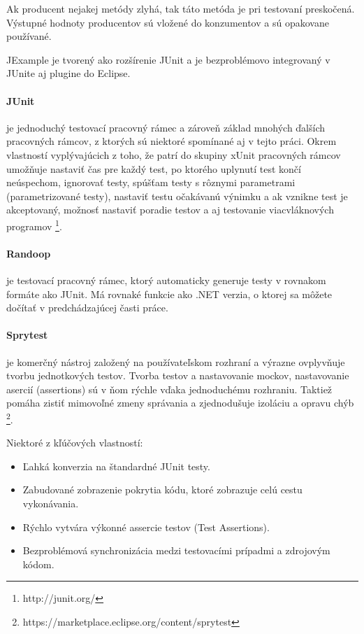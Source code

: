 \documentclass[11pt,twoside,slovak,a4paper]{article}
\begin{document}
	Ak producent nejakej metódy zlyhá, tak táto metóda je pri testovaní preskočená. Výstupné hodnoty producentov sú vložené do konzumentov a sú opakovane používané.
	
	JExample je tvorený ako rozšírenie JUnit a je bezproblémovo integrovaný v JUnite aj plugine do Eclipse.
	
	\paragraph{JUnit} je jednoduchý testovací pracovný rámec a zároveň základ mnohých ďalších pracovných rámcov, z ktorých sú niektoré spomínané aj v tejto práci. Okrem vlastností vyplývajúcich z toho, že patrí do skupiny xUnit pracovných rámcov umožňuje nastaviť čas pre každý test, po ktorého uplynutí test končí neúspechom, ignorovať testy, spúšťam testy s rôznymi parametrami (parametrizované testy), nastaviť testu očakávanú výnimku a ak vznikne test je akceptovaný, možnosť nastaviť poradie testov a aj testovanie viacvláknových programov \footnote{http://junit.org/}. 
	
	\paragraph{Randoop} je testovací pracovný rámec, ktorý automaticky generuje testy v rovnakom formáte ako JUnit. Má rovnaké funkcie ako .NET verzia, o ktorej sa môžete dočítať v predchádzajúcej časti práce.
	
	\paragraph{Sprytest} je komerčný nástroj založený na používateľskom rozhraní a výrazne ovplyvňuje tvorbu jednotkových testov. Tvorba testov a nastavovanie mockov, nastavovanie asercií (assertions) sú v ňom rýchle vďaka jednoduchému rozhraniu. Taktiež pomáha zistiť mimovoľné zmeny správania a zjednodušuje izoláciu a opravu chýb \footnote{https://marketplace.eclipse.org/content/sprytest}.
	
	Niektoré z kľúčových vlastností:
	\begin{itemize}
		\item Ľahká konverzia na štandardné JUnit testy.
		\item Zabudované zobrazenie pokrytia kódu, ktoré zobrazuje celú cestu vykonávania.
		\item Rýchlo vytvára výkonné assercie testov (Test Assertions).
		\item Bezproblémová synchronizácia medzi testovacími prípadmi a zdrojovým kódom.
	\end{itemize}
	
\end{document}

